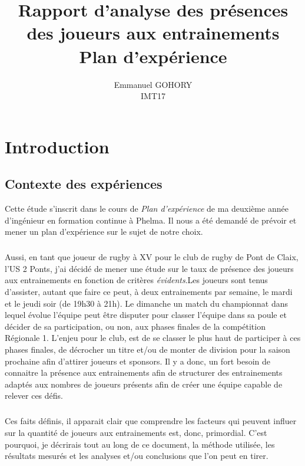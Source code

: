 \documentclass[12pt, a4paper,french]{report}
\begin{document}
\title{Rapport d'analyse des présences des joueurs aux entrainements \\[1ex] \large Plan d'expérience}
\author{Emmanuel GOHORY\\IMT17} 
\maketitle

\tableofcontents

\chapter{Introduction}
  \section{Contexte des expériences}
    Cette étude s'inscrit dans le cours de \emph{Plan d'expérience} de ma deuxième année d'ingénieur en formation continue à Phelma. Il nous a été demandé de prévoir et mener un plan d'expérience sur le sujet de notre choix. 
    \paragraph{}Aussi, en tant que joueur de rugby à XV pour le club de rugby de Pont de Claix, l'US 2 Ponts, j'ai décidé de mener une étude sur le taux de présence des joueurs aux entrainements en fonction de critères \emph{évidents}.Les joueurs sont tenus d'assister, autant que faire ce peut, à deux entrainements par semaine, le mardi et le jeudi soir (de 19h30 à 21h). Le dimanche un match du championnat dans lequel évolue l'équipe peut être disputer pour classer l'équipe dans sa poule et décider de sa participation, ou non, aux phases finales de la compétition Régionale 1. L'enjeu pour le club, est de se classer le plus haut de participer à ces phases finales, de décrocher un titre et/ou de monter de division pour la saison prochaine afin d'attirer joueurs et sponsors. Il y a donc, un fort besoin de connaitre la présence aux entrainements afin de structurer des entrainements adaptés aux nombres de joueurs présents afin de créer une équipe capable de relever ces défis. 
    \paragraph{}Ces faits définis, il apparait clair que comprendre les facteurs qui peuvent influer sur la quantité de joueurs aux entrainements est, donc, primordial. C'est pourquoi, je décrirais tout au long de ce document, la méthode utilisée, les résultats mesurés et les analyses et/ou conclusions que l'on peut en tirer.
\end{document}
